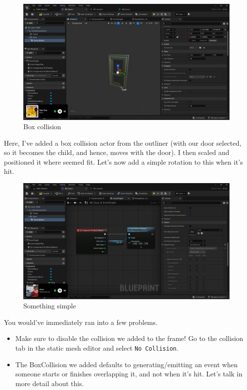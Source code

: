 \documentclass[]{article}
\begin{document}
	\begin{figure}[h]
		\centering
		\includegraphics[width=1\linewidth]{week2part2/screenshot008}
		\caption{Box collision}
		\label{fig:screenshot008}
	\end{figure}
	
	Here, I've added a box collision actor from the outliner (with our door selected, so it becomes the child, and hence, moves with the door). I then scaled and positioned it where seemed fit. Let's now add a simple rotation to this when it's hit.
	
	\newpage
	
	\begin{figure}[h]
		\centering
		\includegraphics[width=1\linewidth]{week2part2/screenshot009}
		\caption{Something simple}
		\label{fig:screenshot009}
	\end{figure}
	
	You would've immediately ran into a few problems.
	\begin{itemize}
		\item Make sure to disable the collision we added to the frame! Go to the collision tab in the static mesh editor and select \verb|No Collision|.
		\item The BoxCollision we added defaults to generating/emitting an event when someone starts or finishes overlapping it, and not when it's hit. Let's talk in more detail about this.
	\end{itemize}
	
\end{document}
